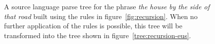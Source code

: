 \documentclass[free]{flammie}
\newcommand{\node}[1]{\begin{tabular}{c}#1\end{tabular}}
\begin{document}
\begin{figure}
\begin{minipage}{\textwidth}
        \centering
        \caption{A source language parse tree for the phrase \emph{the house by
        the side of that road} built using the rules in
        figure~\ref{fig:recursion}. When no further application of the rules is
        possible, this tree will be transformed into the tree shown in
        figure~\ref{tree:recursion-eus}.}\label{tree:recursion-eng}
\end{minipage}


\end{figure}
\end{document}
